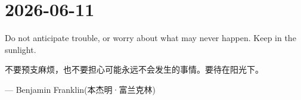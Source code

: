 \section*{2026-06-11}
Do not anticipate trouble, or worry about what may never happen. Keep in the sunlight. \par
不要预支麻烦，也不要担心可能永远不会发生的事情。要待在阳光下。 \par
\hfill --- Benjamin Franklin(本杰明·富兰克林) \par
